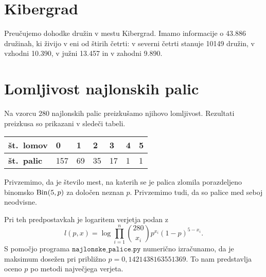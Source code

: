 \documentclass[12pt, a4paper]{article}
\begin{document}
\renewcommand{\headheight}{20pt}

\maketitle
\thispagestyle{empty}

\newpage

\section{Kibergrad}

Preučujemo dohodke družin v mestu Kibergrad. Imamo informacije o 43.886 družinah, 
ki živijo v eni od štirih četrti: v severni četrti stanuje 10149 družin, v
vzhodni 10.390, v južni 13.457 in v zahodni 9.890. 

\newpage

\section{Lomljivost najlonskih palic}
Na vzorcu $280$ najlonskih palic preizkušamo njihovo lomljivost. Rezultati 
preizkusa so prikazani v sledeči tabeli.
\begin{table}[H]
    \centering
    \begin{tabular}{|l||l|l|l|l|l|l|}
        \hline
        \textbf{št.~lomov} & 0   & 1  & 2  & 3  & 4 & 5 \\ \hline
        \textbf{št.~palic} & 157 & 69 & 35 & 17 & 1 & 1 \\ \hline
    \end{tabular}
\end{table}
Privzemimo, da je število mest, na katerih se je palica 
zlomila porazdeljeno binomsko $\operatorname{Bin}(5, p)$ za določen neznan $p$.
Privzemimo tudi, da so palice med seboj neodvisne.

Pri teh predpostavkah je logaritem verjetja podan z
\[
    l(p, x) = \log\prod_{i=1}^n \binom{280}{x_i}p^{x_i}(1-p)^{5-x_i}.
\]
S pomočjo programa $\texttt{najlonske\_palice.py}$ numerično izračunamo, da je maksimum 
dosežen pri približno $p = 0{,}1421438163551369$. To nam predstavlja oceno $p$
po metodi največjega verjeta.
\end{document}
